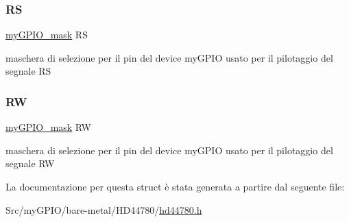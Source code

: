 \subsubsection{\texorpdfstring{RS}{RS}}
{\footnotesize\ttfamily \hyperlink{group__bare-metal_ga402a0d20afc0cb7c25554b8b023f4253}{my\+G\+P\+I\+O\+\_\+mask} RS}

maschera di selezione per il pin del device my\+G\+P\+IO usato per il pilotaggio del segnale RS \mbox{\label{struct_h_d44780___l_c_d__t_af404868fc36134454144950be4977d95}} 
\subsubsection{\texorpdfstring{RW}{RW}}
{\footnotesize\ttfamily \hyperlink{group__bare-metal_ga402a0d20afc0cb7c25554b8b023f4253}{my\+G\+P\+I\+O\+\_\+mask} RW}

maschera di selezione per il pin del device my\+G\+P\+IO usato per il pilotaggio del segnale RW 

La documentazione per questa struct è stata generata a partire dal seguente file\+:\begin{DoxyCompactItemize}
\item 
Src/my\+G\+P\+I\+O/bare-\/metal/\+H\+D44780/\hyperlink{hd44780_8h}{hd44780.\+h}\end{DoxyCompactItemize}
